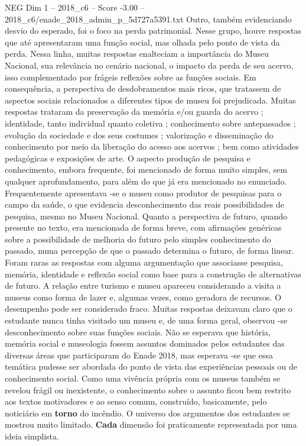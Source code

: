 \begin{textsample}{NEG Dim 1 – 2018\_c6 – Score -3.00 – 2018\_c6/enade\_2018\_admin\_p\_5d727a5391.txt}
Outro, também evidenciando desvio do esperado, foi o foco na perda patrimonial.
Nesse grupo, houve respostas que até apresentaram uma função social, mas olhada pelo ponto de vista da perda.
Nessa linha, muitas respostas enalteciam a importância do Museu Nacional, sua relevância no cenário nacional, o impacto da perda de seu acervo, isso complementado por frágeis reflexões sobre as funções sociais.
Em consequência, a perspectiva de desdobramentos mais ricos, que tratassem de aspectos sociais relacionados a diferentes tipos de museu foi prejudicada.
Muitas respostas trataram da preservação da memória e/ou guarda do acervo ; identidade, tanto individual quanto coletiva ; conhecimento sobre antepassados ; evolução da sociedade e dos seus costumes ; valorização e disseminação do conhecimento por meio da liberação do acesso aos acervos ; bem como atividades pedagógicas e exposições de arte.
O aspecto produção de pesquisa e conhecimento, embora frequente, foi mencionado de forma muito simples, sem qualquer aprofundamento, para além do que já era mencionado no enunciado.
Frequentemente apresentava -se o museu como produtor de pesquisas para o campo da saúde, o que evidencia desconhecimento das reais possibilidades de pesquisa, mesmo no Museu Nacional.
Quanto a perspectiva de futuro, quando presente no texto, era mencionada de forma breve, com afirmações genéricas sobre a possibilidade de melhoria do futuro pelo simples conhecimento do passado, numa percepção de que o passado determina o futuro, de forma linear.
Foram raras as respostas com alguma argumentação que associasse pesquisa, memória, identidade e reflexão social como base para a construção de alternativas de futuro.
A relação entre turismo e museu apareceu considerando a visita a museus como forma de lazer e, algumas vezes, como geradora de recursos.
O desempenho pode ser considerado fraco.
Muitas respostas deixavam claro que o estudante nunca tinha visitado um museu e, de uma forma geral, observou -se desconhecimento sobre suas funções sociais.
Não se esperava que história, memória social e museologia fossem assuntos dominados pelos estudantes das diversas áreas que participaram do Enade 2018, mas esperava -se que essa temática pudesse ser abordada do ponto de vista das experiências pessoais ou de conhecimento social.
Como uma vivência própria com os museus também se revelou frágil ou inexistente, o conhecimento sobre o assunto ficou bem restrito aos textos motivadores e ao senso comum, construído, basicamente, pelo noticiário em \textbf{torno} do incêndio.
O universo dos argumentos dos estudantes se mostrou muito limitado. \textbf{Cada} dimensão foi praticamente representada por uma ideia simplista.

\end{textsample}
